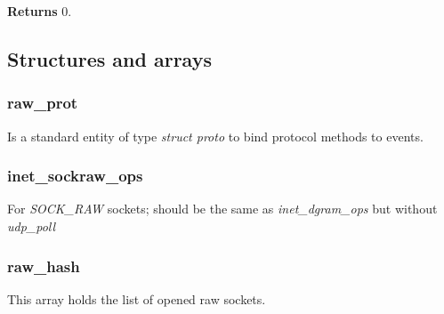 \documentclass[12pt,a4paper]{article}
\begin{document}
{\bf Returns} 0.


\subsection{Structures and arrays}
\label{sec:raw_sock_strustures}

\subsubsection{raw\_prot}
\label{sec:raw_sock_structures_raw_prot}
Is a standard entity of type {\it struct proto} to bind protocol methods to
events.

\subsubsection{inet\_sockraw\_ops}
\label{sec:raw_sock_structures_inet_sockraw_ops}
For {\it SOCK\_RAW} sockets; should be the same as {\it inet\_dgram\_ops} but without
{\it udp\_poll}

\subsubsection{raw\_hash}
\label{sec:raw_sock_structures_raw_hash}
This array holds the list of opened raw sockets.

\subsubsection{}
\label{sec:}
\begin{verbatim}
\end{verbatim}
\end{document}
